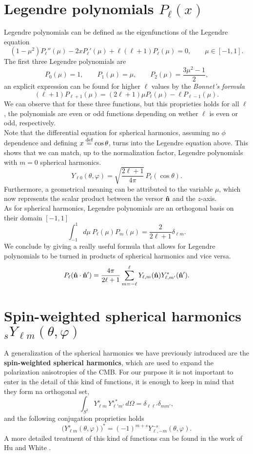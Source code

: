 \section{Legendre polynomials \(P_\ell(x)\)}
\label{app:legendre}
Legendre polynomials can be defined as the eigenfunctions of the Legendre equation 
\[
(1-\mu^2)P_\ell''(\mu)-2xP_\ell'(\mu)+\ell(\ell+1)P_\ell(\mu)=0,\qquad \mu\in[-1,1].
\]
The first three Legendre polynomials are 
$$
P_0(\mu)=1,\qquad P_1(\mu)=\mu,\qquad P_2(\mu)=\frac{3\mu^2-1}{2},
$$
an explicit expression can be found for higher $\ell$ values by the \emph{Bonnet's formula}
\[
(\ell+1)P_{\ell+1}(\mu)=(2\ell+1)\mu P_\ell(\mu)-\ell P_{\ell-1}(\mu).
\]
We can observe that for these three functions, but this proprieties holds for all $\ell$, the polynomials are even or odd functions depending on wether $\ell$ is even or odd, respectively.\\
Note that the differential equation for spherical harmonics, assuming no $\phi$ dependence and defining $x\stackrel{\text{def}}{=}\cos\theta$, turns into the Legendre equation above. This shows that we can match, up to the normalization factor, Legendre polynomials with $m=0$ spherical harmonics.
\[
Y_{\ell 0}(\theta,\varphi)=\sqrt{\frac{2\ell+1}{4\pi}}\,P_\ell(\cos\theta).
\]
Furthermore, a geometrical meaning can be attributed to the variable $\mu$, which now represents the scalar product between the versor $\mathbf{\hat{n}}$ and the $z$-axis.\\
As for spherical harmonics, Legendre polynomials are an orthogonal basis on their domain $[-1,1]$
\[
\int_{-1}^{1}d\mu\ P_\ell(\mu)P_{m}(\mu)=\frac{2}{2\ell+1}\delta_{\ell m}.
\]
We conclude by giving a really useful formula that allows for Legendre polynomials to be turned in products of spherical harmonics and vice versa.
$$
P_\ell(\mathbf{\hat{n}}\cdot\mathbf{\hat{n}}')=\frac{4\pi}{2\ell+1}\sum_{m=-\ell}^\ell Y_{\ell,m}(\mathbf{\hat{n}})Y^*_{\ell,m'}(\mathbf{\hat{n}}').$$



\section{Spin-weighted spherical harmonics \({}_sY_{\ell m}(\theta,\varphi)\)}
\label{app:spin-weighted}
A generalization of the spherical harmonics we have previously introduced are the \textbf{spin-weighted spherical harmonics}, which are used to expand the polarization anisotropies of the CMB. 
For our purpose it is not important to enter in the detail of this kind of functions, it is enough to keep in mind that they form na orthogonal set,
\[
\int_{S^2} Y^s_{\ell m}\,Y^{s*}_{\ell' m'}\,d\Omega=\delta_{\ell\ell'}\delta_{mm'},
\]
and the following conjugation proprieties holds
\[
\big(Y^s_{\ell m}(\theta,\varphi)\big)^*=(-1)^{m+s}Y^{-s}_{\ell,-m}(\theta,\varphi).
\]
A more detailed treatment of this kind of functions can be found in the work of Hu and White \cite{HuWhite}. 

